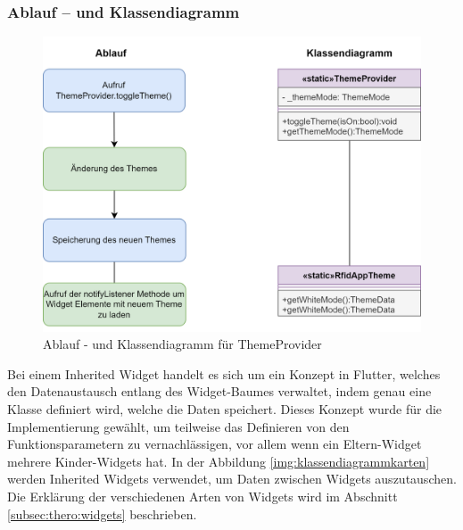 \subsubsection{Ablauf – und Klassendiagramm}
\begin{figure}[h!]
\centering
\includegraphics[width=1\textwidth]{FLUTTER/images/GP/ThemeProviderAblauf.png}
\caption{Ablauf - und Klassendiagramm für ThemeProvider}
\end{figure}
\newpage
{}\label{inheritedwidget}
Bei einem Inherited Widget handelt es sich um ein Konzept in Flutter, welches den Datenaustausch entlang des Widget-Baumes verwaltet, indem genau eine Klasse definiert wird, welche die Daten speichert. Dieses Konzept wurde für die Implementierung gewählt, um teilweise das Definieren von den Funktionsparametern zu vernachlässigen, vor allem wenn ein Eltern-Widget mehrere Kinder-Widgets hat. In der Abbildung \ref{img:klassendiagrammkarten} werden Inherited Widgets verwendet, um Daten zwischen Widgets auszutauschen. Die Erkl\"arung der verschiedenen Arten von Widgets wird im Abschnitt \ref{subsec:thero:widgets}  beschrieben.


